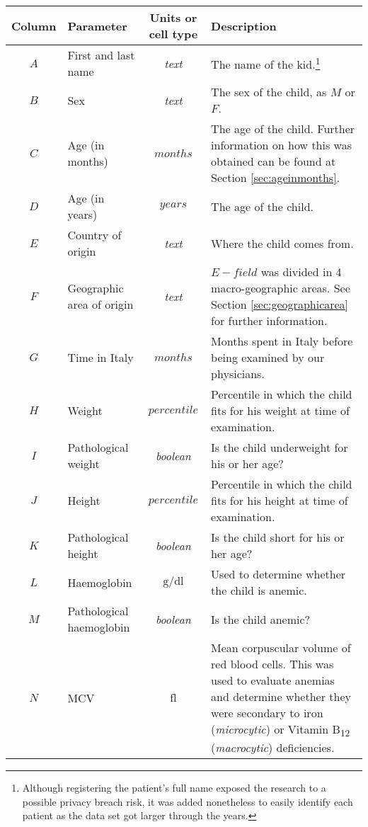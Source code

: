 \begin{footnotesize}
	\centering
	\begin{longtable}{C{.09\mylength} p{.25\mylength} C{.20\mylength} p{.40\mylength}}
	Column & Parameter & Units or cell type & Description\\
	\hline
	$A$ & First and last name & \textit{text} & The name of the kid.\footnote{Although registering the patient's full name exposed the research to a possible privacy breach risk, it was added nonetheless to easily identify each patient as the data set got larger through the years.}\\
	$B$ & Sex & \textit{text} & The sex of the child, as $M$ or $F$.\\
	$C$ & Age (in months) & $months$ & The age of the child. Further information on how this was obtained can be found at Section \ref{sec:ageinmonths}.\\
	$D$ & Age (in years) & $years$ & The age of the child.\\
	$E$ & Country of origin & \textit{text} & Where the child comes from.\\
	$F$ & Geographic area of origin & \textit{text} & $E-field$ was divided in 4 macro-geographic areas. See Section \ref{sec:geographicarea} for further information.\\
	$G$ & Time in Italy & $months$ &  Months spent in Italy before being examined by our physicians.\\
	$H$ & Weight & $percentile$ & Percentile in which the child fits for his weight at time of examination.\\
	$I$ & Pathological weight & \textit{boolean} & Is the child underweight for his or her age?\\
	$J$ & Height & $percentile$ & Percentile in which the child fits for his height at time of examination.\\
	$K$ & Pathological height & \textit{boolean} & Is the child short for his or her age?\\
	$L$ & Haemoglobin & $\si{\gram}/\si{\deci\litre}$ & Used to determine whether the child is anemic.\\
	$M$ & Pathological haemoglobin & \textit{boolean} & Is the child anemic?\\
	$N$ & MCV & $\si{\femto\litre}$ & Mean corpuscular volume of red blood cells. This was used to evaluate anemias and determine whether they were secondary to iron (\textit{microcytic}) or Vitamin B\textsubscript{12} (\textit{macrocytic}) deficiencies.\\

\end{longtable}
\end{footnotesize}
